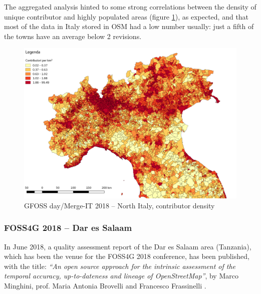 \documentclass{Configuration_Files/PoliMi3i_thesis}
\begin{document}
The aggregated analysis hinted to some strong correlations between the density of unique contributor and highly populated areas (figure \ref{fig:contributors_density_north}), as expected, and that most of the data in Italy stored in OSM had a low number usually: just a fifth of the towns have an average below 2 revisions.

\begin{figure}[ht]
    \centering
    \includegraphics[width=1\textwidth]{Images/contributors_density_north.png}
    \caption{GFOSS day/Merge-IT 2018 – North Italy, contributor density}
    \label{fig:contributors_density_north}
\end{figure}


\subsubsection{FOSS4G 2018 – Dar es Salaam}

In June 2018, a quality assessment report of the Dar es Salaam area (Tanzania), which has been the venue for the FOSS4G 2018 conference, has been published, with the title: \textit{“An open source approach for the intrinsic assessment of the temporal accuracy, up-to-dateness and lineage of OpenStreetMap”}, by Marco Minghini, prof. Maria Antonia Brovelli and Francesco Frassinelli \cite{minghiniOpenSourceApproach2018}.
\end{document}
